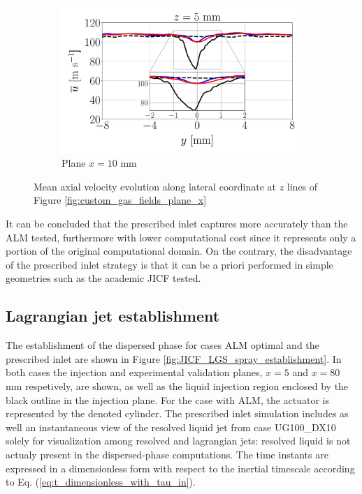 \begin{figure}[ht]
\begin{subfigure}[b]{1.0\textwidth}
   \includegraphics[scale=0.24]{./part2_developments/figures_ch6_lagrangian_JICF/gas_field_initial_conditions/custom_line_x10_z05p0_ux_mean_along_y}
   \vspace*{-0.1in}
	\caption{Plane $x = 10$ mm}
\end{subfigure}
   \caption{Mean axial velocity evolution along lateral coordinate at $z$ lines of Figure \ref{fig:custom_gas_fields_plane_x}}
\label{fig:JICF_custom_lines_iso-x_along_y_ux_mean}
\end{figure}

It can be concluded that the prescribed inlet captures more accurately than the ALM tested, furthermore with lower computational cost since it represents only a portion of the original computational domain. On the contrary, the disadvantage of the prescribed inlet strategy is that it can be a priori performed in simple geometries such as the academic JICF tested. 



\subsection{Lagrangian jet establishment}

The establishment of the dispersed phase for cases ALM optimal and the prescribed inlet are shown in Figure \ref{fig:JICF_LGS_spray_establishment}. In both cases  the injection and experimental validation planes, $x = 5$ and $x = 80$ mm respetively, are shown, as well as the liquid injection region enclosed by the black outline in the injection plane. For the case with ALM, the actuator is represented by the denoted cylinder. The prescribed inlet simulation includes as well an instantaneous view of the resolved liquid jet from case UG100\_DX10 solely for visualization among resolved and lagrangian jets: resolved liquid is not actualy present in the dispersed-phase computations. The time instants are expressed in a dimensionless form with respect to the inertial timescale according to Eq. (\ref{eq:t_dimensionless_with_tau_in}).

